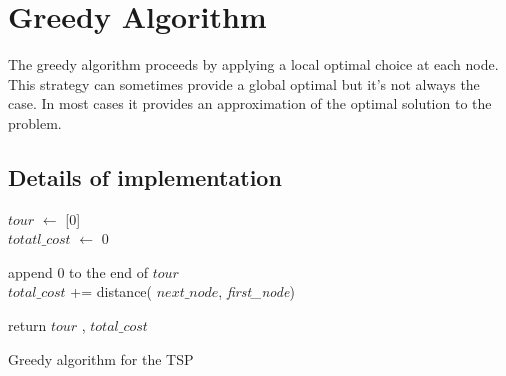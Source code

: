 \documentclass[11pt, english]{article}
\begin{document}
\section{Greedy Algorithm}
	The greedy algorithm proceeds by applying a local optimal choice at each node. This strategy can sometimes provide a global optimal but it's not always the case. In most cases it provides an approximation of the optimal solution to the problem.
	
\subsection{Details of implementation}

	\begin{center}
	\colorbox[gray]{0.95}{
	\begin{minipage}{0.65\textwidth}
	\begin{algorithm}[H]
		\bigskip
		$\textit{tour}$ $\leftarrow$ [0] \\
		$\textit{totatl\_cost}$ $\leftarrow$ 0 \\
		
	
		append 0 to the end of $\textit{tour}$\\
		
		$\textit{total\_cost}$ += distance( $\textit{next\_node}$,  \textit{first\_node})
		
		return $\textit{tour}$ , $\textit{total\_cost}$\\
		\bigskip
		\caption{Greedy algorithm for the TSP}
	\end{algorithm}
	\end{minipage}}
	\end{center}
\end{document}
